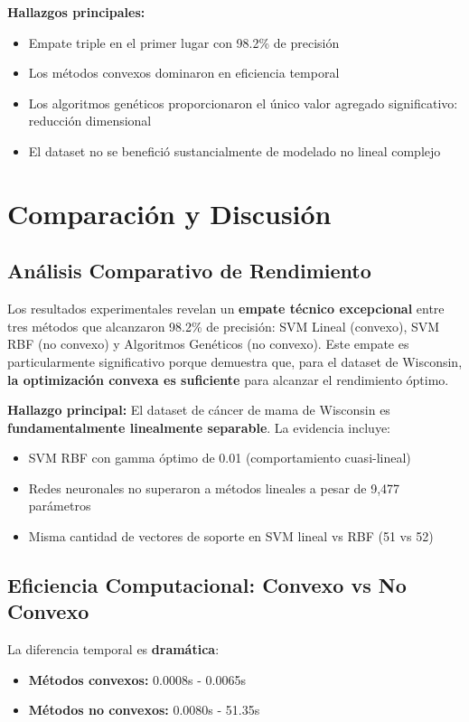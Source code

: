 \documentclass[12pt,a4paper]{article}
\begin{document}
\textbf{Hallazgos principales:}
\begin{itemize}
    \item Empate triple en el primer lugar con 98.2\% de precisión
    \item Los métodos convexos dominaron en eficiencia temporal
    \item Los algoritmos genéticos proporcionaron el único valor agregado significativo: reducción dimensional
    \item El dataset no se benefició sustancialmente de modelado no lineal complejo
\end{itemize}

\section{Comparación y Discusión}

\subsection{Análisis Comparativo de Rendimiento}

Los resultados experimentales revelan un \textbf{empate técnico excepcional} entre tres métodos que alcanzaron 98.2\% de precisión: SVM Lineal (convexo), SVM RBF (no convexo) y Algoritmos Genéticos (no convexo). Este empate es particularmente significativo porque demuestra que, para el dataset de Wisconsin, \textbf{la optimización convexa es suficiente} para alcanzar el rendimiento óptimo.

\textbf{Hallazgo principal:} El dataset de cáncer de mama de Wisconsin es \textbf{fundamentalmente linealmente separable}. La evidencia incluye:
\begin{itemize}
    \item SVM RBF con gamma óptimo de 0.01 (comportamiento cuasi-lineal)
    \item Redes neuronales no superaron a métodos lineales a pesar de 9,477 parámetros
    \item Misma cantidad de vectores de soporte en SVM lineal vs RBF (51 vs 52)
\end{itemize}

\subsection{Eficiencia Computacional: Convexo vs No Convexo}

La diferencia temporal es \textbf{dramática}:
\begin{itemize}
    \item \textbf{Métodos convexos:} 0.0008s - 0.0065s
    \item \textbf{Métodos no convexos:} 0.0080s - 51.35s
\end{itemize}
\end{document}
